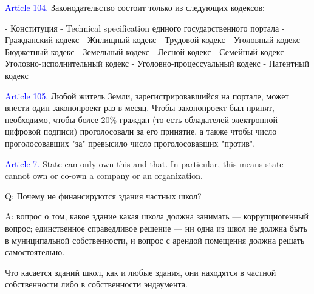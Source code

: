 \documentclass[11pt]{article}
\theoremstyle{remark}
\theoremstyle{definition}
\begin{document}
\textcolor{blue}{Article 104.} Законодательство состоит только из следующих кодексов:

- Конституция
- Technical specification единого государственного портала
- Гражданский кодекс
- Жилищный кодекс
- Трудовой кодекс
- Уголовный кодекс
- Бюджетный кодекс
- Земельный кодекс
- Лесной кодекс
- Семейный кодекс
- Уголовно-исполнительный кодекс
- Уголовно-процессуальный кодекс
- Патентный кодекс




\textcolor{blue}{Article 105.} Любой житель Земли, зарегистрировавшийся на портале, может внести один законопроект раз в месяц. Чтобы законопроект был принят, необходимо, чтобы более 20\% граждан (то есть обладателей электронной цифровой подписи) проголосовали за его принятие, а также чтобы число проголосовавших "за" превысило число проголосовавших "против".

\color{blue}



\color{black}













\textcolor{blue}{Article 7.} State can only own this and that. In particular, this means state cannot own or co-own a company or an organization. 

Q: Почему не финансируются здания частных школ?

A: вопрос о том, какое здание какая школа должна занимать --- коррупциогенный вопрос; единственное справедливое решение --- ни одна из школ не должна быть в муниципальной собственности, и вопрос с арендой помещения должна решать самостоятельно.

Что касается зданий школ, как и любые здания, они находятся в частной собственности либо в собственности эндаумента.
\end{document}
